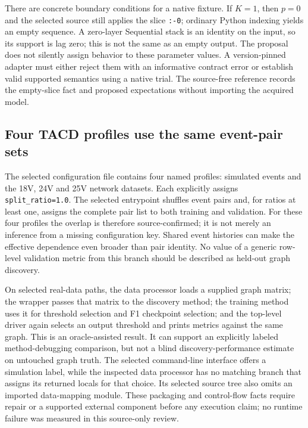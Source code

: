 There are concrete boundary conditions for a native fixture. If $K=1$, then $p=0$ and the
selected source still applies the slice \texttt{:-0}; ordinary Python indexing yields an empty
sequence. A zero-layer Sequential stack is an identity on the input, so its support is lag zero; this is not the same as an empty output. The proposal does not
silently assign behavior to these parameter values. A version-pinned adapter must either reject
them with an informative contract error or establish valid supported semantics using a native
trial. The source-free reference records the empty-slice fact and proposed expectations without
importing the acquired model.~\citep{exec28_at_protocol_reference}

\subsection{Four TACD profiles use the same event-pair sets}
The selected configuration file contains four named profiles: simulated events and the 18V,
24V and 25V network datasets. Each explicitly assigns \texttt{split\_ratio=1.0}. The selected
entrypoint shuffles event pairs and, for ratios at least one, assigns the complete pair list to
both training and validation. For these four profiles the overlap is therefore source-confirmed;
it is not merely an inference from a missing configuration key. Shared event histories can make
the effective dependence even broader than pair identity. No value of a generic row-level
validation metric from this branch should be described as held-out graph discovery.
\citep{exec28_at_tacd_protocol}

On selected real-data paths, the data processor loads a supplied graph matrix; the wrapper
passes that matrix to the discovery method; the training method uses it for threshold selection
and F1 checkpoint selection; and the top-level driver again selects an output threshold and prints
metrics against the same graph. This is an oracle-assisted result. It can support an explicitly
labeled method-debugging comparison, but not a blind discovery-performance estimate on untouched
graph truth. The selected command-line interface offers a simulation label, while the inspected
data processor has no matching branch that assigns its returned locals for that choice. Its
selected source tree also omits an imported data-mapping module. These packaging and control-flow
facts require repair or a supported external component before any execution claim; no runtime
failure was measured in this source-only review.~\citep{exec28_at_tacd_protocol}

